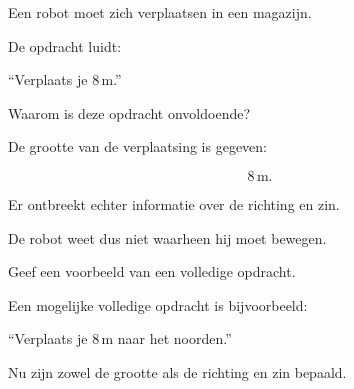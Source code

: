 \documentclass{ximera}
\begin{document}
\begin{oefening}{\oefB\ESS}

Een robot moet zich verplaatsen in een magazijn.

\begin{question}
De opdracht luidt:

\begin{center}
``Verplaats je $8\,\si{\meter}$.''
\end{center}

Waarom is deze opdracht onvoldoende?

\begin{oplossing}
De grootte van de verplaatsing is gegeven:

\[
8\,\si{\meter}.
\]

Er ontbreekt echter informatie over de richting en zin.

De robot weet dus niet waarheen hij moet bewegen.
\end{oplossing}
\end{question}


\begin{question}
Geef een voorbeeld van een volledige opdracht.

\begin{oplossing}
Een mogelijke volledige opdracht is bijvoorbeeld:

\begin{center}
``Verplaats je $8\,\si{\meter}$ naar het noorden.''
\end{center}

Nu zijn zowel de grootte als de richting en zin bepaald.
\end{oplossing}
\end{question}

\end{oefening}
\end{document}
